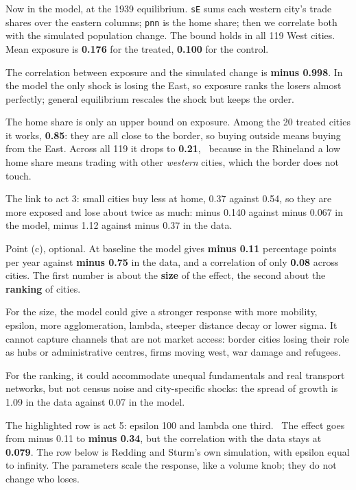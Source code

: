 \begin{say}
 Now in the model, at the 1939 equilibrium. \texttt{sE} sums each western city's trade shares over the eastern columns; \texttt{pnn} is the home share; then we correlate both with the simulated population change. The bound holds in all 119 West cities. Mean exposure is \textbf{0.176} for the treated, \textbf{0.100} for the control.

 The correlation between exposure and the simulated change is \textbf{minus 0.998}. In the model the only shock is losing the East, so exposure ranks the losers almost perfectly; general equilibrium rescales the shock but keeps the order.

 The home share is only an upper bound on exposure. Among the 20 treated cities it works, \textbf{0.85}: they are all close to the border, so buying outside means buying from the East. Across all 119 it drops to \textbf{0.21}, \pause\ because in the Rhineland a low home share means trading with other \emph{western} cities, which the border does not touch.

 The link to act 3: small cities buy less at home, 0.37 against 0.54, so they are more exposed and lose about twice as much: minus 0.140 against minus 0.067 in the model, minus 1.12 against minus 0.37 in the data.
\end{say}

\begin{say}
 Point (c), optional. At baseline the model gives \textbf{minus 0.11} percentage points per year against \textbf{minus 0.75} in the data, and a correlation of only \textbf{0.08} across cities. The first number is about the \textbf{size} of the effect, the second about the \textbf{ranking} of cities.

 For the size, the model could give a stronger response with more mobility, epsilon, more agglomeration, lambda, steeper distance decay or lower sigma. It cannot capture channels that are not market access: border cities losing their role as hubs or administrative centres, firms moving west, war damage and refugees.

 For the ranking, it could accommodate unequal fundamentals and real transport networks, but not census noise and city-specific shocks: the spread of growth is 1.09 in the data against 0.07 in the model.

 The highlighted row is act 5: epsilon 100 and lambda one third. \pause\ The effect goes from minus 0.11 to \textbf{minus 0.34}, but the correlation with the data stays at \textbf{0.079}. The row below is Redding and Sturm's own simulation, with epsilon equal to infinity. The parameters scale the response, like a volume knob; they do not change who loses.
\end{say}

